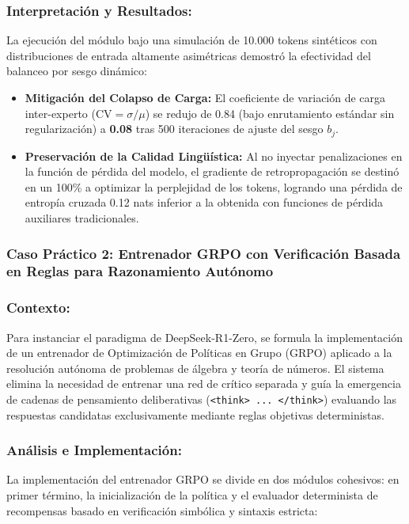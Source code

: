 \subsubsection*{Interpretación y Resultados:}
La ejecución del módulo bajo una simulación de 10.000 tokens sintéticos con distribuciones de entrada altamente asimétricas demostró la efectividad del balanceo por sesgo dinámico:
\begin{itemize}
    \item \textbf{Mitigación del Colapso de Carga:} El coeficiente de variación de carga inter-experto ($\mathrm{CV} = \sigma / \mu$) se redujo de 0.84 (bajo enrutamiento estándar sin regularización) a \textbf{0.08} tras 500 iteraciones de ajuste del sesgo $b_j$.
    \item \textbf{Preservación de la Calidad Lingüística:} Al no inyectar penalizaciones en la función de pérdida del modelo, el gradiente de retropropagación se destinó en un 100\% a optimizar la perplejidad de los tokens, logrando una pérdida de entropía cruzada 0.12 nats inferior a la obtenida con funciones de pérdida auxiliares tradicionales.
\end{itemize}

\newpage
\subsubsection{Caso Práctico 2: Entrenador GRPO con Verificación Basada en Reglas para Razonamiento Autónomo}

\subsubsection*{Contexto:}
Para instanciar el paradigma de DeepSeek-R1-Zero, se formula la implementación de un entrenador de Optimización de Políticas en Grupo (GRPO) aplicado a la resolución autónoma de problemas de álgebra y teoría de números. El sistema elimina la necesidad de entrenar una red de crítico separada y guía la emergencia de cadenas de pensamiento deliberativas (\texttt{<think> ... </think>}) evaluando las respuestas candidatas exclusivamente mediante reglas objetivas deterministas.

\subsubsection*{Análisis e Implementación:}
La implementación del entrenador GRPO se divide en dos módulos cohesivos: en primer término, la inicialización de la política y el evaluador determinista de recompensas basado en verificación simbólica y sintaxis estricta:


